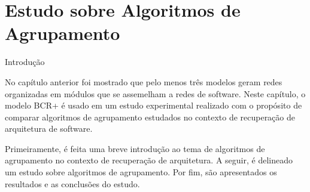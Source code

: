 
\chapter{Estudo sobre Algoritmos de Agrupamento} \label{cap:estudo}


\begin{section}{Introdução}

No capítulo anterior foi mostrado que pelo menos três modelos geram redes organizadas em módulos que se assemelham a redes de software. Neste capítulo, o modelo BCR+ é usado em um estudo experimental realizado com o propósito de comparar algoritmos de agrupamento estudados no contexto de recuperação de arquitetura de software. 

Primeiramente, é feita uma breve introdução ao tema de algoritmos de agrupamento no contexto de recuperação de arquitetura. A seguir, é delineado um estudo sobre algoritmos de agrupamento. Por fim, são apresentados os resultados e as conclusões do estudo.

\end{section}


